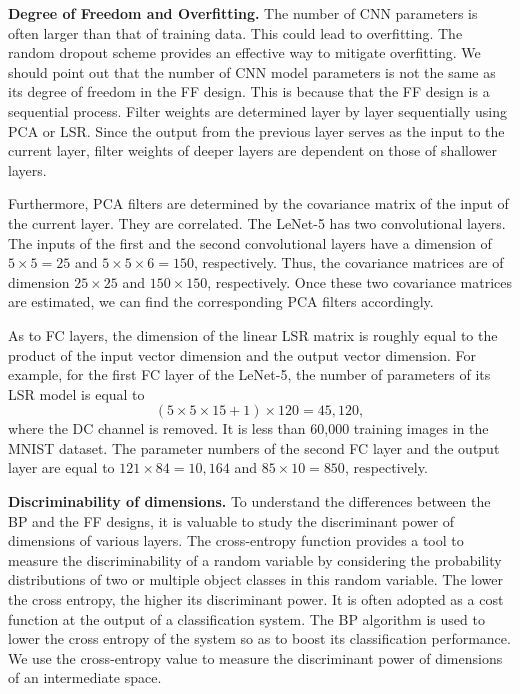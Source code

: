 \documentclass[preprint,12pt]{elsarticle}
\begin{document}
{\bf Degree of Freedom and Overfitting.} The number of CNN parameters is
often larger than that of training data. This could lead to overfitting.
The random dropout scheme \cite{JMLR:v15:srivastava14a} provides an
effective way to mitigate overfitting.  We should point out that the
number of CNN model parameters is not the same as its degree of freedom
in the FF design. This is because that the FF design is a sequential
process.  Filter weights are determined layer by layer sequentially
using PCA or LSR.  Since the output from the previous layer serves as
the input to the current layer, filter weights of deeper layers are
dependent on those of shallower layers. 

Furthermore, PCA filters are determined by the covariance matrix of the
input of the current layer. They are correlated.  The LeNet-5 has two
convolutional layers.  The inputs of the first and the second
convolutional layers have a dimension of $5 \times 5=25$ and $5 \times 5
\times 6=150$, respectively.  Thus, the covariance matrices are of
dimension $25 \times 25$ and $150 \times 150$, respectively. Once these
two covariance matrices are estimated, we can find the corresponding PCA
filters accordingly.  

As to FC layers, the dimension of the linear LSR matrix is roughly equal
to the product of the input vector dimension and the output vector
dimension. For example, for the first FC layer of the LeNet-5, the
number of parameters of its LSR model is equal to
\begin{equation}\label{eq:B}
(5 \times 5 \times 15 +1) \times 120=45,120, 
\end{equation}
where the DC channel is removed.  It is less than 60,000 training
images in the MNIST dataset.  The parameter numbers of the second FC
layer and the output layer are equal to $121 \times 84=10,164$ and $85
\times 10=850$, respectively. 

{\bf Discriminability of dimensions.} To understand the differences
between the BP and the FF designs, it is valuable to study the
discriminant power of dimensions of various layers.  The cross-entropy
function provides a tool to measure the discriminability of a random
variable by considering the probability distributions of two or multiple
object classes in this random variable.  The lower the cross entropy,
the higher its discriminant power. It is often adopted as a cost
function at the output of a classification system. The BP algorithm is
used to lower the cross entropy of the system so as to boost its
classification performance. We use the cross-entropy value to
measure the discriminant power of dimensions of an intermediate space. 
\end{document}
